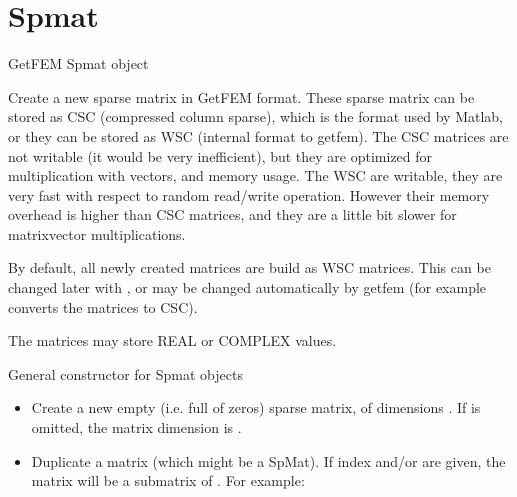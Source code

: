 \documentclass[a4paper,11pt,english]{sphinxmanual}
\begin{document}
\section{Spmat}
\label{\detokenize{python/cmdref_Spmat:spmat}}\label{\detokenize{python/cmdref_Spmat::doc}}

\begin{fulllineitems}
\label{\detokenize{python/cmdref_Spmat:getfem.Spmat}}
GetFEM Spmat object

Create a new sparse matrix in GetFEM format. These sparse matrix can be stored as CSC (compressed column
sparse), which is the format used by Matlab, or they can be stored as WSC
(internal format to getfem). The CSC matrices are not writable (it would
be very inefficient), but they are optimized for multiplication with
vectors, and memory usage. The WSC are writable, they are very fast with
respect to random read/write operation. However their memory overhead is
higher than CSC matrices, and they are a little bit slower for
matrix\sphinxhyphen{}vector multiplications.

By default, all newly created matrices are build as WSC matrices. This can
be changed later with , or may be changed
automatically by getfem (for example  converts the
matrices to CSC).

The matrices may store REAL or COMPLEX values.

General constructor for Spmat objects
\begin{itemize}
\item {} 
Create a new empty (i.e. full of zeros) sparse matrix, of dimensions
. If  is omitted, the matrix dimension is .

\item {} 
Duplicate a matrix  (which might be a SpMat). If index  and/or  are given, the matrix will
be a submatrix of . For example:


\end{itemize}
\end{fulllineitems}
\end{document}
